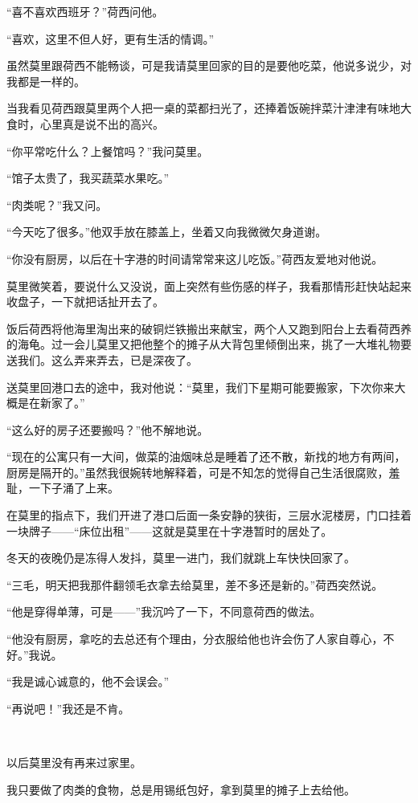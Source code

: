 \par “喜不喜欢西班牙？”荷西问他。
\par “喜欢，这里不但人好，更有生活的情调。”
\par 虽然莫里跟荷西不能畅谈，可是我请莫里回家的目的是要他吃菜，他说多说少，对我都是一样的。
\par 当我看见荷西跟莫里两个人把一桌的菜都扫光了，还捧着饭碗拌菜汁津津有味地大食时，心里真是说不出的高兴。
\par “你平常吃什么？上餐馆吗？”我问莫里。
\par “馆子太贵了，我买蔬菜水果吃。”
\par “肉类呢？”我又问。
\par “今天吃了很多。”他双手放在膝盖上，坐着又向我微微欠身道谢。
\par “你没有厨房，以后在十字港的时间请常常来这儿吃饭。”荷西友爱地对他说。
\par 莫里微笑着，要说什么又没说，面上突然有些伤感的样子，我看那情形赶快站起来收盘子，一下就把话扯开去了。
\par 饭后荷西将他海里淘出来的破铜烂铁搬出来献宝，两个人又跑到阳台上去看荷西养的海龟。过一会儿莫里又把他整个的摊子从大背包里倾倒出来，挑了一大堆礼物要送我们。这么弄来弄去，已是深夜了。
\par 送莫里回港口去的途中，我对他说：“莫里，我们下星期可能要搬家，下次你来大概是在新家了。”
\par “这么好的房子还要搬吗？”他不解地说。
\par “现在的公寓只有一大间，做菜的油烟味总是睡着了还不散，新找的地方有两间，厨房是隔开的。”虽然我很婉转地解释着，可是不知怎的觉得自己生活很腐败，羞耻，一下子涌了上来。
\par 在莫里的指点下，我们开进了港口后面一条安静的狭街，三层水泥楼房，门口挂着一块牌子——“床位出租”——这就是莫里在十字港暂时的居处了。
\par 冬天的夜晚仍是冻得人发抖，莫里一进门，我们就跳上车快快回家了。
\par “三毛，明天把我那件翻领毛衣拿去给莫里，差不多还是新的。”荷西突然说。
\par “他是穿得单薄，可是——”我沉吟了一下，不同意荷西的做法。
\par “他没有厨房，拿吃的去总还有个理由，分衣服给他也许会伤了人家自尊心，不好。”我说。
\par “我是诚心诚意的，他不会误会。”
\par “再说吧！”我还是不肯。
\par  
\par 以后莫里没有再来过家里。
\par 我只要做了肉类的食物，总是用锡纸包好，拿到莫里的摊子上去给他。
